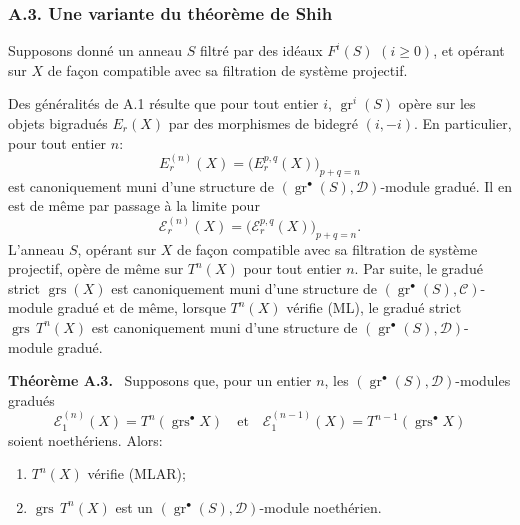 \documentclass[11pt]{article}
\newenvironment{statement}[1]{\par\medskip\noindent\textbf{#1.}\ }{\par\medskip}
\providecommand{\gr}{\operatorname{gr}}
\providecommand{\gr}{\operatorname{gr}}
\providecommand{\gr}{\operatorname{gr}}
\providecommand{\grs}{\operatorname{grs}}
\begin{document}
\subsubsection*{A.3. Une variante du théorème de Shih}
Supposons donné un anneau \(S\) filtré par des idéaux \(F^i(S)\) \((i\ge0)\), et opérant sur \(X\) de façon compatible avec sa filtration de système projectif.

Des généralités de A.1 résulte que pour tout entier \(i\), \(\gr^i(S)\) opère sur les objets bigradués \(E_r(X)\) par des morphismes de bidegré \((i,-i)\). En particulier, pour tout entier \(n\):
\[
E_r^{(n)}(X)=\bigl(E_r^{p,q}(X)\bigr)_{p+q=n}
\]
est canoniquement muni d'une structure de \((\gr^\bullet(S),\mathcal D)\)-module gradué. Il en est de même par passage à la limite pour
\[
\mathcal E_r^{(n)}(X)=\bigl(\mathcal E_r^{p,q}(X)\bigr)_{p+q=n}.
\]
L'anneau \(S\), opérant sur \(X\) de façon compatible avec sa filtration de système projectif, opère de même sur \(T^n(X)\) pour tout entier \(n\). Par suite, le gradué strict \(\grs(X)\) est canoniquement muni d'une structure de \((\gr^\bullet(S),\mathcal C)\)-module gradué et de même, lorsque \(T^n(X)\) vérifie (ML), le gradué strict \(\grs\,T^n(X)\) est canoniquement muni d'une structure de \((\gr^\bullet(S),\mathcal D)\)-module gradué.

\begin{statement}{Théorème A.3}
Supposons que, pour un entier \(n\), les \((\gr^\bullet(S),\mathcal D)\)-modules gradués
\[
\mathcal E_1^{(n)}(X)=T^n(\grs^\bullet X)
\quad\text{et}\quad
\mathcal E_1^{(n-1)}(X)=T^{n-1}(\grs^\bullet X)
\]
soient noethériens. Alors:
\begin{enumerate}[label=\textup{(\roman*)}]
\item \(T^n(X)\) vérifie (MLAR);
\item \(\grs\,T^n(X)\) est un \((\gr^\bullet(S),\mathcal D)\)-module noethérien.
\end{enumerate}
\end{statement}
\end{document}
